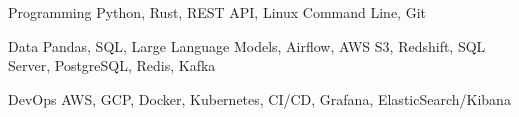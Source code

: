 

\begin{cvskills}

  \cvskill
    {Programming} %
    {Python, Rust, REST API, Linux Command Line, Git} %
    
  \cvskill
    {Data} %
    {Pandas, SQL, Large Language Models, Airflow, AWS S3, Redshift, SQL Server, PostgreSQL, Redis, Kafka} %
        
  \cvskill
    {DevOps} %
    {AWS, GCP, Docker, Kubernetes, CI/CD, Grafana, ElasticSearch/Kibana} %

\end{cvskills}
